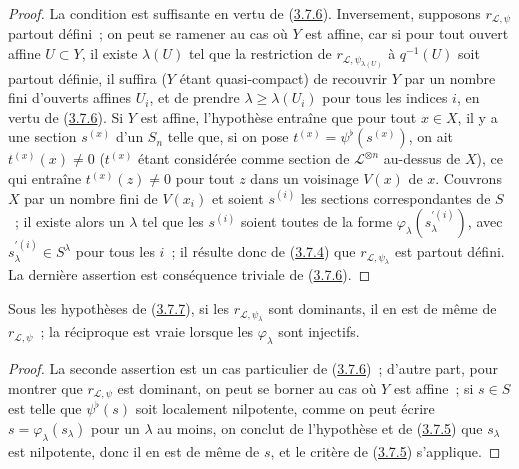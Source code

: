\begin{proof}
La condition est suffisante en vertu de
(\hyperref[II.3.7.6-fr]{3.7.6}). Inversement, supposons
$r_{\mathcal{L},\psi}$ partout défini~; on peut se ramener au cas où $Y$ est
affine, car si pour tout ouvert affine $U\subset Y$, il existe $\lambda(U)$
tel que la restriction de $r_{\mathcal{L},\psi_{\lambda(U)}}$ à $q^{-1}(U)$
soit partout définie, il suffira ($Y$ étant quasi-compact) de recouvrir $Y$
par un nombre fini d'ouverts affines $U_i$, et de prendre
$\lambda\geq\lambda(U_i)$ pour tous les indices $i$, en vertu de
(\hyperref[II.3.7.6-fr]{3.7.6}). Si $Y$ est affine, l'hypothèse entraîne que
pour tout $x\in X$, il y a une section $s^{(x)}$ d'un $S_n$ telle que, si on
pose $t^{(x)}=\psi^\flat(s^{(x)})$, on ait $t^{(x)}(x)\neq0$
($t^{(x)}$ étant considérée comme section de $\mathcal{L}^{\otimes n}$
au-dessus de $X$), ce qui entraîne $t^{(x)}(z)\neq0$ pour tout $z$ dans un
voisinage $V(x)$ de $x$. Couvrons $X$ par un nombre fini de $V(x_i)$ et
soient $s^{(i)}$ les sections correspondantes de $S$~; il existe alors un
$\lambda$ tel que les $s^{(i)}$ soient toutes de la forme
$\varphi_\lambda(s_\lambda^{\prime(i)})$, avec $s_\lambda^{\prime(i)}\in S^\lambda$ pour
tous les $i$~; il résulte donc de (\hyperref[II.3.7.4-fr]{3.7.4}) que
$r_{\mathcal{L},\psi_\lambda}$ est partout défini. La dernière assertion est
conséquence triviale de (\hyperref[II.3.7.6-fr]{3.7.6}).
\end{proof}

\begin{corollary}[3.7.8]
\label{II.3.7.8-fr}
Sous les hypothèses de \textup{(\hyperref[II.3.7.7-fr]{3.7.7})}, si les
$r_{\mathcal{L},\psi_\lambda}$ sont dominants, il en est de même de
$r_{\mathcal{L},\psi}$~; la réciproque est vraie lorsque les
$\varphi_\lambda$ sont injectifs.
\end{corollary}


\begin{proof}
La seconde assertion est un cas particulier de
(\hyperref[II.3.7.6-fr]{3.7.6})~; d'autre part, pour montrer que
$r_{\mathcal{L},\psi}$ est dominant, on peut se borner au cas où $Y$ est
affine~; si $s\in S$ est telle que $\psi^\flat(s)$ soit localement
nilpotente, comme on peut écrire $s=\varphi_\lambda(s_\lambda)$ pour un
$\lambda$ au moins, on conclut de l'hypothèse et de
(\hyperref[II.3.7.5-fr]{3.7.5}) que $s_\lambda$ est nilpotente, donc il en est
de même de $s$, et le critère de (\hyperref[II.3.7.5-fr]{3.7.5}) s'applique.
\end{proof}

